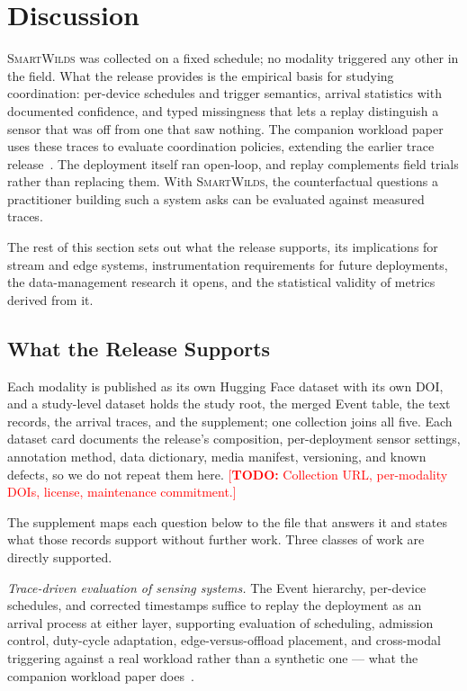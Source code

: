 \documentclass[sigconf]{acmart}
\newcommand{\smartwilds}{\textsc{SmartWilds}\xspace}
\newcommand{\TODO}[1]{\textcolor{red}{\footnotesize[\textbf{TODO:} #1]}}
\newcommand{\TODO}[1]{}
\begin{document}
\section{Discussion}
\label{sec:discussion}
\label{sec:using}

\smartwilds was collected on a fixed schedule; no modality triggered any
other in the field. What the release provides is the empirical basis for
studying coordination: per-device schedules and trigger semantics,
arrival statistics with documented confidence, and typed missingness
that lets a replay distinguish a sensor that was off from one that saw
nothing. The companion workload paper~\cite{kline2026blueprint} uses
these traces to evaluate coordination policies, extending the earlier
trace release~\cite{kline2025smartwilds}. The deployment itself ran
open-loop, and replay complements field trials rather than replacing
them. With \smartwilds, the counterfactual questions a practitioner
building such a system asks can be evaluated against measured traces.

The rest of this section sets out what the release supports, its
implications for stream and edge systems, instrumentation requirements
for future deployments, the data-management research it opens, and the
statistical validity of metrics derived from it.

\subsection{What the Release Supports}

Each modality is published as its own Hugging Face dataset with its own
DOI, and a study-level dataset holds the study root, the merged Event
table, the text records, the arrival traces, and the supplement; one
collection joins all five. Each dataset card documents the release's
composition, per-deployment sensor settings, annotation method, data
dictionary, media manifest, versioning, and known defects, so we do not
repeat them here.
\TODO{Collection URL, per-modality DOIs, license, maintenance
commitment.}

The supplement maps each question below to the file that answers it and
states what those records support without further work. Three classes
of work are directly supported.

\emph{Trace-driven evaluation of sensing systems.} The Event hierarchy,
per-device schedules, and corrected timestamps suffice to replay the
deployment as an arrival process at either layer, supporting evaluation
of scheduling, admission control, duty-cycle adaptation,
edge-versus-offload placement, and cross-modal triggering against a real
workload rather than a synthetic one --- what the companion workload
paper does~\cite{kline2026blueprint}.
\end{document}
